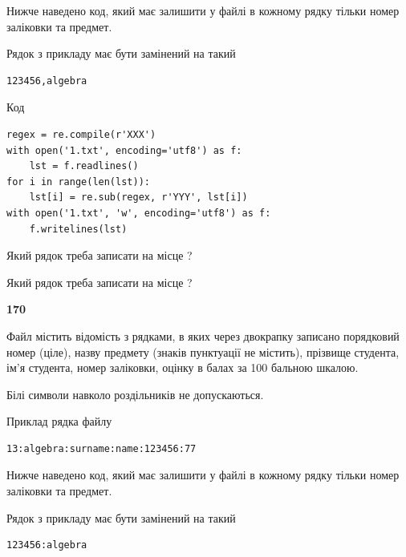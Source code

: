 Нижче наведено код, який має залишити у файлі в кожному рядку тільки номер заліковки та предмет.

Рядок з прикладу має бути замінений на такий



\begin{verbatim}
123456,algebra
\end{verbatim}




Код



\begin{verbatim}
regex = re.compile(r'XXX')
with open('1.txt', encoding='utf8') as f:
    lst = f.readlines()
for i in range(len(lst)):
    lst[i] = re.sub(regex, r'YYY', lst[i])
with open('1.txt', 'w', encoding='utf8') as f:
    f.writelines(lst)
\end{verbatim}









Який рядок треба записати на місце  ?\par
\vspace{5mm}


Який рядок треба записати на місце  ?\par


\newpage

{\begin {center}\textbf{ 170}\end {center}}\par
Файл  містить відомість з рядками, в яких через двокрапку записано поряд\-ковий номер (ціле), назву предмету (знаків пунктуації не містить), прізвище студента, ім'я студента, номер заліковки, оцінку в балах за 100 бальною шкалою.

Білі символи навколо роздільників не допускаються.

Приклад рядка файлу



\begin{verbatim}
13:algebra:surname:name:123456:77
\end{verbatim}


Нижче наведено код, який має залишити у файлі в кожному рядку тільки номер заліковки та предмет.

Рядок з прикладу має бути замінений на такий



\begin{verbatim}
123456:algebra
\end{verbatim}




